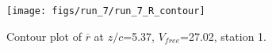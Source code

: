 \begin{figure}[H]
\centering
\texttt{[image: figs/run\_7/run\_7\_R\_contour]}
\caption{Contour plot of $\overline{r}$ at $z/c$=5.37, $V_{free}$=27.02, station 1.}
\label{fig:run_7_R_contour}
\end{figure}



